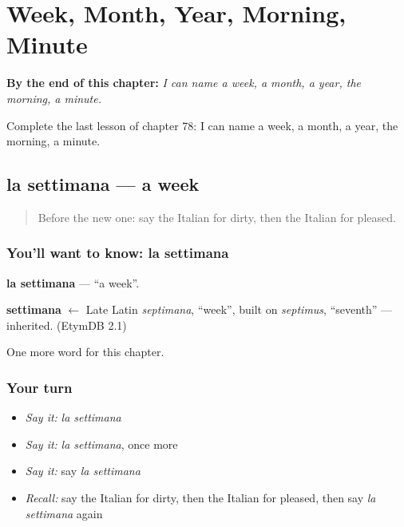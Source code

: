 
\chapter{Week, Month, Year, Morning, Minute}
\label{ch:it-week-month-year-morning-minute}

\begin{chapteropening}
\textbf{By the end of this chapter:} \emph{I can name a week, a month, a year, the morning, a minute.}

Complete the last lesson of chapter 78: I can name a week, a month, a year, the morning, a minute.
\end{chapteropening}

\section[la settimana]{la settimana — a week}

\label{lesson:IT-C78-settimana}



\begin{quote}
Before the new one: say the Italian for dirty, then the Italian for pleased.
\end{quote}

\subsection*{You'll want to know: la settimana}
\textbf{la settimana} — \textquotedblleft{}a week\textquotedblright{}.

\begin{cousinweb}
\textbf{settimana} $\leftarrow$ Late Latin \emph{septimana}, \textquotedblleft{}week\textquotedblright{}, built on \emph{septimus}, \textquotedblleft{}seventh\textquotedblright{} — inherited. (EtymDB 2.1)
\end{cousinweb}

\begin{grammarlens}[title={What you've built}]
One more word for this chapter.
\end{grammarlens}

\subsection*{Your turn}
\begin{itemize}
\raggedright
  \item \emph{Say it:} \emph{la settimana}
  \item \emph{Say it:} \emph{la settimana}, once more
  \item \emph{Say it:} say \emph{la settimana}
  \item \emph{Recall:} say the Italian for dirty, then the Italian for pleased, then say \emph{la settimana} again
\end{itemize}

